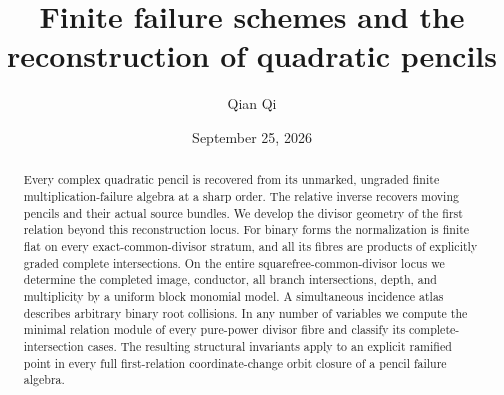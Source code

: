 \title[Finite failure schemes and quadratic pencils]{Finite failure schemes and the reconstruction of quadratic pencils}
\author{Qian Qi}
\date{September 25, 2026}
\begin{abstract}
Every complex quadratic pencil is recovered from its unmarked,
ungraded finite multiplication-failure algebra at a sharp order.
The relative inverse recovers moving pencils and their actual source
bundles. We develop the divisor geometry of the first relation beyond
this reconstruction locus. For binary forms the normalization is finite
flat on every exact-common-divisor stratum, and all its fibres are
products of explicitly graded complete intersections. On the entire
squarefree-common-divisor locus we determine the completed image,
conductor, all branch intersections, depth, and multiplicity by a
uniform block monomial model. A simultaneous incidence atlas describes
arbitrary binary root collisions. In any number of variables we compute
the minimal relation module of every pure-power divisor fibre and
classify its complete-intersection cases. The resulting structural
invariants apply to an explicit ramified point in every full
first-relation coordinate-change orbit closure of a pencil failure
algebra.
\end{abstract}
\maketitle
